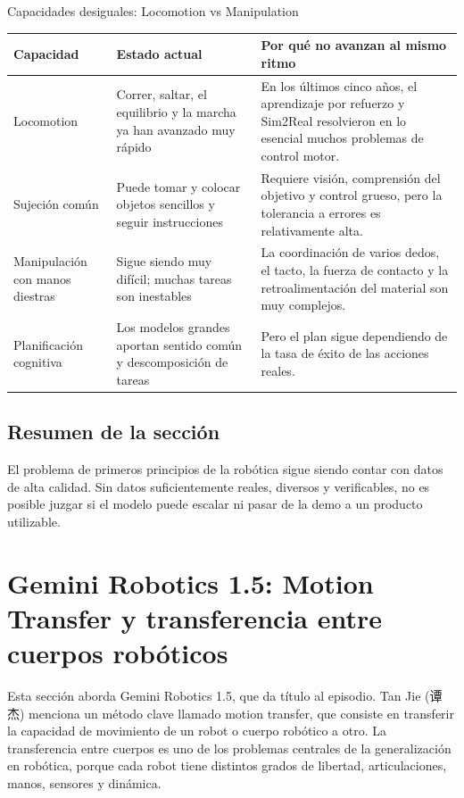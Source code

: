 \documentclass[a4paper]{article}
\begin{document}
\begin{knowledgebox}{Capacidades desiguales: Locomotion vs Manipulation}
\begin{tabularx}{\textwidth}{p{}p{}X}
\toprule
Capacidad & Estado actual & Por qué no avanzan al mismo ritmo \\
\midrule
Locomotion & Correr, saltar, el equilibrio y la marcha ya han avanzado muy rápido & En los últimos cinco años, el aprendizaje por refuerzo y Sim2Real resolvieron en lo esencial muchos problemas de control motor. \\
Sujeción común & Puede tomar y colocar objetos sencillos y seguir instrucciones & Requiere visión, comprensión del objetivo y control grueso, pero la tolerancia a errores es relativamente alta. \\
Manipulación con manos diestras & Sigue siendo muy difícil; muchas tareas son inestables & La coordinación de varios dedos, el tacto, la fuerza de contacto y la retroalimentación del material son muy complejos. \\
Planificación cognitiva & Los modelos grandes aportan sentido común y descomposición de tareas & Pero el plan sigue dependiendo de la tasa de éxito de las acciones reales. \\
\bottomrule
\end{tabularx}
\end{knowledgebox}

\subsection{Resumen de la sección}

El problema de primeros principios de la robótica sigue siendo contar con datos de alta calidad. Sin datos suficientemente reales, diversos y verificables, no es posible juzgar si el modelo puede escalar ni pasar de la demo a un producto utilizable.
\section{Gemini Robotics 1.5: Motion Transfer y transferencia entre cuerpos robóticos}

Esta sección aborda Gemini Robotics 1.5, que da título al episodio. Tan Jie (谭杰) menciona un método clave llamado motion transfer, que consiste en transferir la capacidad de movimiento de un robot o cuerpo robótico a otro. La transferencia entre cuerpos es uno de los problemas centrales de la generalización en robótica, porque cada robot tiene distintos grados de libertad, articulaciones, manos, sensores y dinámica.
\end{document}

